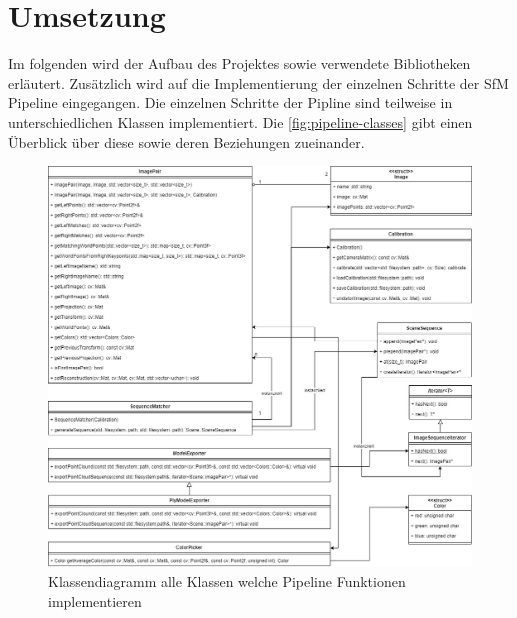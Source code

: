 \chapter{Umsetzung}\label{sec:implementation}
Im folgenden wird der Aufbau des Projektes sowie verwendete Bibliotheken erläutert.
Zusätzlich wird auf die Implementierung der einzelnen Schritte der SfM Pipeline eingegangen.
Die einzelnen Schritte der Pipline sind teilweise in unterschiedlichen Klassen implementiert.
Die \autoref{fig:pipeline-classes} gibt einen Überblick über diese sowie deren Beziehungen zueinander.

\begin{figure}
    \centering
    \includegraphics[width=\textwidth]{src/img/classes.jpg}
    \caption{Klassendiagramm alle Klassen welche Pipeline Funktionen implementieren}
    \label{fig:pipeline-classes}
\end{figure}







